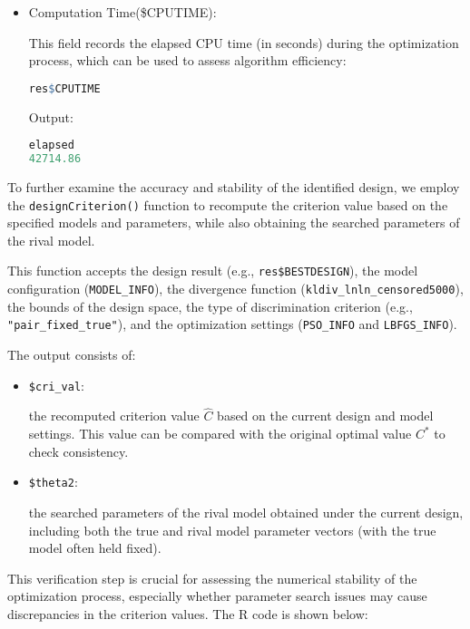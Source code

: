 \begin{itemize}
\item Computation Time(\$CPUTIME):

This field records the elapsed CPU time (in seconds) during the optimization process, which can be used to assess algorithm efficiency:

\begin{lstlisting}[language=R, caption={CPU time of the optimization}]
res$CPUTIME
\end{lstlisting}

Output:

\begin{lstlisting}[language=R, caption={The Output of CPU time of the optimization}]
elapsed
42714.86
\end{lstlisting}

\end{itemize}

\hspace*{8mm} To further examine the accuracy and stability of the identified design, we employ the \verb|designCriterion()| function to recompute the criterion value based on the specified models and parameters, while also obtaining the searched parameters of the rival model.

\hspace*{8mm} This function accepts the design result (e.g., \verb|res$BESTDESIGN|), the model configuration (\verb|MODEL_INFO|), the divergence function (\verb|kldiv_lnln_censored5000|), the bounds of the design space, the type of discrimination criterion (e.g., \verb|"pair_fixed_true"|), and the optimization settings (\verb|PSO_INFO| and \verb|LBFGS_INFO|).

The output consists of:

\begin{itemize}
\item \verb|$cri_val|:

the recomputed criterion value $\hat{C}$ based on the current design and model settings. This value can be compared with the original optimal value $C^*$ to check consistency.

\item \verb|$theta2|:

the searched parameters of the rival model obtained under the current design, including both the true and rival model parameter vectors (with the true model often held fixed).

\end{itemize}

This verification step is crucial for assessing the numerical stability of the optimization process, especially whether parameter search issues may cause discrepancies in the criterion values. The R code is shown below:


